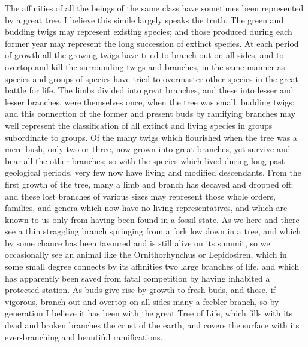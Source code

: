 \darwinpair
{The affinities of all the beings of the same class have sometimes been represented by a great tree. I believe this simile largely speaks the truth. The green and budding twigs may represent existing species; and those produced during each former year may represent the long succession of extinct species. At each period of growth all the growing twigs have tried to branch out on all sides, and to overtop and kill the surrounding twigs and branches, in the same manner as species and groups of species have tried to overmaster other species in the great battle for life. The limbs divided into great branches, and these into lesser and lesser branches, were themselves once, when the tree was small, budding twigs; and this connection of the former and present buds by ramifying branches may well represent the classification of all extinct and living species in groups subordinate to groups. Of the many twigs which flourished when the tree was a mere bush, only two or three, now grown into great branches, yet survive and bear all the other branches; so with the species which lived during long-past geological periods, very few now have living and modified descendants. From the first growth of the tree, many a limb and branch has decayed and dropped off; and these lost branches of various sizes may represent those whole orders, families, and genera which now have no living representatives, and which are known to us only from having been found in a fossil state. As we here and there see a thin straggling branch springing from a fork low down in a tree, and which by some chance has been favoured and is still alive on its summit, so we occasionally see an animal like the Ornithorhynchus or Lepidosiren, which in some small degree connects by its affinities two large branches of life, and which has apparently been saved from fatal competition by having inhabited a protected station. As buds give rise by growth to fresh buds, and these, if vigorous, branch out and overtop on all sides many a feebler branch, so by generation I believe it has been with the great Tree of Life, which fills with its dead and broken branches the crust of the earth, and covers the surface with its ever-branching and beautiful ramifications.}
